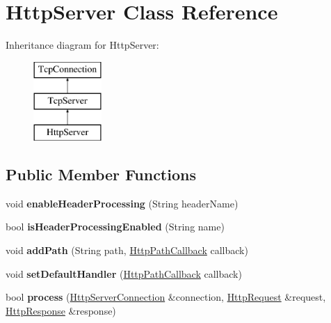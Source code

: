 \hypertarget{class_http_server}{}\section{Http\+Server Class Reference}
\label{class_http_server}
Inheritance diagram for Http\+Server\+:\begin{figure}[H]
\begin{center}
\leavevmode
\includegraphics[height=3.000000cm]{class_http_server}
\end{center}
\end{figure}
\subsection*{Public Member Functions}
\begin{DoxyCompactItemize}
\item 
\hypertarget{class_http_server_aff1d6aa5491cb05d48162ee36c053f7e}{}void {\bfseries enable\+Header\+Processing} (String header\+Name)\label{class_http_server_aff1d6aa5491cb05d48162ee36c053f7e}

\item 
\hypertarget{class_http_server_aec0af0131fb2b96868759cd5901813da}{}bool {\bfseries is\+Header\+Processing\+Enabled} (String name)\label{class_http_server_aec0af0131fb2b96868759cd5901813da}

\item 
\hypertarget{class_http_server_ad0bd05da46ae1bec9a4e3bc824f43ad1}{}void {\bfseries add\+Path} (String path, \hyperlink{class_delegate}{Http\+Path\+Callback} callback)\label{class_http_server_ad0bd05da46ae1bec9a4e3bc824f43ad1}

\item 
\hypertarget{class_http_server_afa5843b00c8021851105e3cc5ced17eb}{}void {\bfseries set\+Default\+Handler} (\hyperlink{class_delegate}{Http\+Path\+Callback} callback)\label{class_http_server_afa5843b00c8021851105e3cc5ced17eb}

\item 
\hypertarget{class_http_server_ab552d521b9e702c26aab4c3df9ca5bc5}{}bool {\bfseries process} (\hyperlink{class_http_server_connection}{Http\+Server\+Connection} \&connection, \hyperlink{class_http_request}{Http\+Request} \&request, \hyperlink{class_http_response}{Http\+Response} \&response)\label{class_http_server_ab552d521b9e702c26aab4c3df9ca5bc5}

\end{DoxyCompactItemize}
